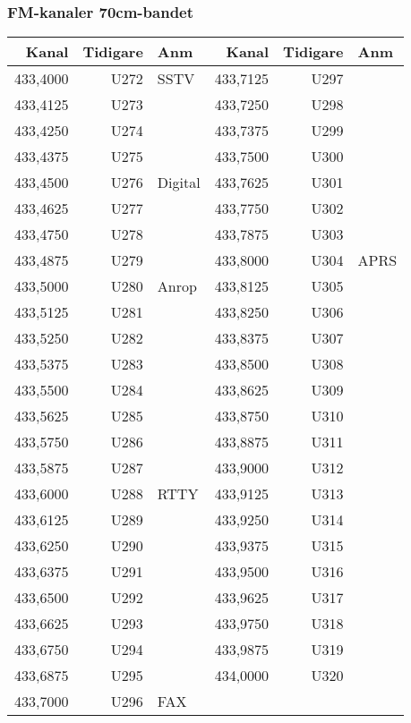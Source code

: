 \clearpage
\subsubsection{FM-kanaler 70cm-bandet}

\begin{longtable}{rrl|rrl}
\textbf{Kanal} & \textbf{Tidigare} & \textbf{Anm}   
&  \textbf{Kanal} & \textbf{Tidigare} & \textbf{Anm} \\ \hline
	433,4000 &  U272 & SSTV    & 433,7125 &  U297 &      \\
	433,4125 &  U273 &         & 433,7250 &  U298 &      \\
	433,4250 &  U274 &         & 433,7375 &  U299 &      \\
	433,4375 &  U275 &         & 433,7500 &  U300 &      \\
	433,4500 &  U276 & Digital & 433,7625 &  U301 &      \\
	433,4625 &  U277 &         & 433,7750 &  U302 &      \\
	433,4750 &  U278 &         & 433,7875 &  U303 &      \\
	433,4875 &  U279 &         & 433,8000 &  U304 & APRS \\
	433,5000 &  U280 & Anrop   & 433,8125 &  U305 &      \\
	433,5125 &  U281 &         & 433,8250 &  U306 &      \\
	433,5250 &  U282 &         & 433,8375 &  U307 &      \\
	433,5375 &  U283 &         & 433,8500 &  U308 &      \\
	433,5500 &  U284 &         & 433,8625 &  U309 &      \\
	433,5625 &  U285 &         & 433,8750 &  U310 &      \\
	433,5750 &  U286 &         & 433,8875 &  U311 &      \\
	433,5875 &  U287 &         & 433,9000 &  U312 &      \\
	433,6000 &  U288 & RTTY    & 433,9125 &  U313 &      \\
	433,6125 &  U289 &         & 433,9250 &  U314 &      \\
	433,6250 &  U290 &         & 433,9375 &  U315 &      \\
	433,6375 &  U291 &         & 433,9500 &  U316 &      \\
	433,6500 &  U292 &         & 433,9625 &  U317 &      \\
	433,6625 &  U293 &         & 433,9750 &  U318 &      \\
	433,6750 &  U294 &         & 433,9875 &  U319 &      \\
	433,6875 &  U295 &         & 434,0000 &  U320 &      \\
	433,7000 &  U296 & FAX     &          &       &      \\
\end{longtable}


